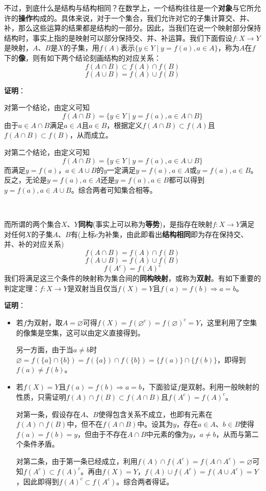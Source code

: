 \documentclass[a4paper,UTF8,fontset=windows,AutoFakeBold]{ctexart}
\newcommand{\proo}[1]{{\vspace{5pt}\kaishu\noindent\textbf{证明}：\vspace{-3pt}
\begin{compactitem}
    \item[] #1
\end{compactitem}
}}
\begin{document}
不过，到底什么是结构与结构相同？在数学上，一个结构往往是一个\textbf{对象}与它所允许的\textbf{操作}构成的。具体来说，对于一个集合，我们允许对它的子集计算交、并、补，那么这些运算的结果都是结构的一部分。因此，当我们在说一个映射部分保持结构时，事实上指的是映射可以部分保持交、并、补运算。我们下面假设$f:X\to Y$是映射，$A$、$B$是$X$的子集，用$f(A)$表示$\{y\in Y\mid y=f(a),a\in A\}$，称为$A$在$f$下的\textbf{像}，则有如下两个结论刻画结构的对应关系：
$$f(A\cap B)\subset f(A)\cap f(B)$$
$$f(A\cup B)=f(A)\cup f(B)$$

\proo{
    对第一个结论，由定义可知
    $$f(A\cap B)=\{y\in Y\mid y=f(a),a\in A\cap B\}$$
    由于$a\in A\cap B$满足$a\in A$且$a\in B$，根据定义$f(A\cap B)\subset f(A)$且$f(A\cap B)\subset f(B)$，从而成立。

    对第二个结论，由定义可知
    $$f(A\cap B)=\{y\in Y\mid y=f(a),a\in A\cup B\}$$
    而满足$y=f(a)$，$a\in A\cup B$的$y$一定满足$y=f(a),a\in A$或$y=f(a),a\in B$。反之，无论是$y=f(a),a\in A$还是$y=f(a),a\in B$都可以得到$y=f(a),a\in A\cup B$。综合两者可知集合相等。
}

\

而所谓的两个集合$X$、$Y$\textbf{同构}(事实上可以称为\textbf{等势})，是指存在映射$f:X\to Y$满足对任何$X$的子集$A$、$B$有(上标$c$为补集，由此即看出\textbf{结构相同}即为存在保持交、并、补的对应关系)
$$f(A\cap B)=f(A)\cap f(B)$$
$$f(A\cup B)=f(A)\cup f(B)$$
$$f(A^c)=f(A)^c$$
我们将满足这三个条件的映射称为集合间的\textbf{同构映射}，或称为\textbf{双射}。有如下重要的判定定理：$f:X\to Y$是双射当且仅当$f(X)=Y$且$f(a)=f(b)\Rightarrow a=b$。

\proo{
    \begin{itemize}
        \item 若$f$为双射，取$A=\varnothing$可得$f(X)=f(\varnothing^c)=f(\varnothing)^c=Y$，这里利用了空集的像集是空集，这可以由定义直接得到。
        
        另一方面，由于当$a\ne b$时$\varnothing=f(\{a\}\cap\{b\})=f(\{a\})\cap f(\{b\})=\{f(a)\}\cap\{f(b)\}$，即得到$f(a)\ne f(b)$。

        \item 若$f(X)=Y$且$f(a)=f(b)\Rightarrow a=b$，下面验证$f$是双射。利用一般映射的性质，只需证明$f(A)\cap f(B)\subset f(A\cap B)$且$f(A^c)=f(A)^c$。
        
        对第一条，假设存在$A$、$B$使得包含关系不成立，也即有元素在$f(A)\cap f(B)$中，但不在$f(A\cap B)$中。设其为$y$，存在$a\in A$、$b\in B$使得$f(a)=f(b)=y$，但由于不存在$A\cap B$中元素的像为$y$，$a\ne b$，从而与第二个条件矛盾。

        对第二条，由于第一条已经成立，利用$f(A)\cap f(A^c)=f(A\cap A^c)=\varnothing$可知$f(A^c)\subset f(A)^c$。再由$f(X)=Y$，$f(A)\cup f(A^c)=f(A\cup A^c)=Y$，因此即得到$f(A)^c\subset f(A^c)$。综合两者得证。
    \end{itemize}
}
\end{document}
